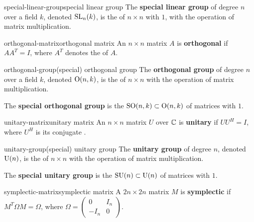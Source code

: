 \begin{topic}{special-linear-group}{special linear group}
    The \textbf{special linear group} of degree $n$ over a field $k$, denoted $\textup{SL}_n(k)$, is the  of $n \times n$  with  $1$, with the operation of matrix multiplication.
\end{topic}

\begin{topic}{orthogonal-matrix}{orthogonal matrix}
    An $n \times n$ matrix $A$ is \textbf{orthogonal} if $A A^T = I$, where $A^T$ denotes the  of $A$.
\end{topic}

\begin{topic}{orthogonal-group}{(special) orthogonal group}
    The \textbf{orthogonal group} of degree $n$ over a field $k$, denoted $\textup{O}(n, k)$, is the  of $n \times n$  with the operation of matrix multiplication.
    
    The \textbf{special orthogonal group} is the  $\textup{SO}(n, k) \subset \textup{O}(n, k)$ of matrices with  $1$.
\end{topic}

\begin{topic}{unitary-matrix}{unitary matrix}
    An $n \times n$ matrix $U$ over $\mathbb{C}$ is \textbf{unitary} if $UU^H = I$, where $U^H$ is its conjugate .
\end{topic}

\begin{topic}{unitary-group}{(special) unitary group}
    The \textbf{unitary group} of degree $n$, denoted $\textup{U}(n)$, is the  of $n \times n$  with the operation of matrix multiplication.
    
    The \textbf{special unitary group} is the  $\textup{SU}(n) \subset \textup{U}(n)$ of matrices with  $1$.
\end{topic}

\begin{topic}{symplectic-matrix}{symplectic matrix}
    A $2n \times 2n$ matrix $M$ is \textbf{symplectic} if $M^T \Omega M = \Omega$, where $\Omega = \begin{pmatrix} 0 & I_n \\ -I_n & 0 \end{pmatrix}$.
\end{topic}


